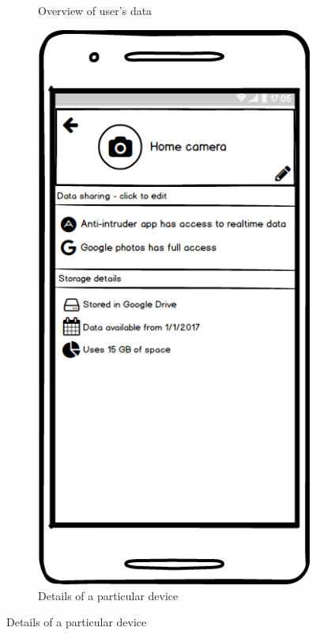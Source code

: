 \documentclass[conference]{IEEEtran}
\begin{document}
\begin{figure}[t]
\begin{subfigure}{0.24\textwidth}
	\caption{Overview of user's data}
	\label{fig:screen1}
	\end{subfigure}
	\begin{subfigure}{0.24\textwidth}
	\includegraphics[width=0.95\linewidth]{screen2.png}
	\caption{Details of a particular device}
	\label{fig:screen2}
	\end{subfigure}

\end{figure}
\end{document}
